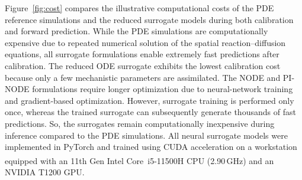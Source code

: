 Figure~\ref{fig:cost} compares the illustrative computational costs of
the PDE reference simulations and the reduced surrogate models during
both calibration and forward prediction. While the PDE simulations are
computationally expensive due to repeated numerical solution of the
spatial reaction--diffusion equations, all surrogate formulations enable
extremely fast predictions after calibration.
The reduced ODE surrogate exhibits the lowest calibration cost because
only a few mechanistic parameters are assimilated. The NODE and
PI-NODE formulations require longer optimization due to neural-network
training and gradient-based optimization. However, surrogate training is performed only once, whereas the trained surrogate can subsequently generate thousands of fast predictions. So, the
surrogates remain computationally inexpensive during inference compared
to the PDE simulations. All neural surrogate models were implemented in PyTorch and trained using CUDA acceleration on a workstation equipped with an 11th Gen Intel\textsuperscript{\textregistered} Core\texttrademark~i5-11500H CPU (2.90\,GHz) and an NVIDIA T1200 GPU.
